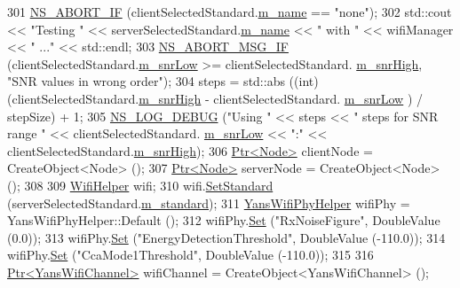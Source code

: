 \begin{DoxyCode}
301   \hyperlink{group__fatal_ga979468222aa80366c2c98aa1554f3eec}{NS\_ABORT\_IF} (clientSelectedStandard.\hyperlink{structStandardInfo_a101f61fce329acf44c178f191d89bc2b}{m\_name} == \textcolor{stringliteral}{"none"});
302   std::cout << \textcolor{stringliteral}{"Testing "} << serverSelectedStandard.\hyperlink{structStandardInfo_a101f61fce329acf44c178f191d89bc2b}{m\_name} << \textcolor{stringliteral}{" with "} << wifiManager << \textcolor{stringliteral}{" ..."} << 
      std::endl;
303   \hyperlink{group__fatal_ga6653324225bc139e46deea177614ceee}{NS\_ABORT\_MSG\_IF} (clientSelectedStandard.\hyperlink{structStandardInfo_afab2372a0827fa35dfb275bf2a003894}{m\_snrLow} >= clientSelectedStandard.
      \hyperlink{structStandardInfo_a9015b8320c397f26eb0eb0d3758c9efa}{m\_snrHigh}, \textcolor{stringliteral}{"SNR values in wrong order"});
304   steps = std::abs ((\textcolor{keywordtype}{int}) (clientSelectedStandard.\hyperlink{structStandardInfo_a9015b8320c397f26eb0eb0d3758c9efa}{m\_snrHigh} - clientSelectedStandard.
      \hyperlink{structStandardInfo_afab2372a0827fa35dfb275bf2a003894}{m\_snrLow} ) / stepSize) + 1;
305   \hyperlink{group__logging_ga413f1886406d49f59a6a0a89b77b4d0a}{NS\_LOG\_DEBUG} (\textcolor{stringliteral}{"Using "} << steps << \textcolor{stringliteral}{" steps for SNR range "} << clientSelectedStandard.
      \hyperlink{structStandardInfo_afab2372a0827fa35dfb275bf2a003894}{m\_snrLow} << \textcolor{stringliteral}{":"} << clientSelectedStandard.\hyperlink{structStandardInfo_a9015b8320c397f26eb0eb0d3758c9efa}{m\_snrHigh});
306   \hyperlink{classns3_1_1Ptr}{Ptr<Node>} clientNode = CreateObject<Node> ();
307   \hyperlink{classns3_1_1Ptr}{Ptr<Node>} serverNode = CreateObject<Node> ();
308 
309   \hyperlink{classns3_1_1WifiHelper}{WifiHelper} wifi;
310   wifi.\hyperlink{classns3_1_1WifiHelper_aa54f3e61527ef8de318d310045bc5dfd}{SetStandard} (serverSelectedStandard.\hyperlink{structStandardInfo_ab7a9f14bfafa7c4a6eb65073bdb28489}{m\_standard});
311   \hyperlink{classns3_1_1YansWifiPhyHelper}{YansWifiPhyHelper} wifiPhy = YansWifiPhyHelper::Default ();
312   wifiPhy.\hyperlink{classns3_1_1WifiPhyHelper_a2527d6d7b29f717fd7436166c5f05f1a}{Set} (\textcolor{stringliteral}{"RxNoiseFigure"}, DoubleValue (0.0));
313   wifiPhy.\hyperlink{classns3_1_1WifiPhyHelper_a2527d6d7b29f717fd7436166c5f05f1a}{Set} (\textcolor{stringliteral}{"EnergyDetectionThreshold"}, DoubleValue (-110.0));
314   wifiPhy.\hyperlink{classns3_1_1WifiPhyHelper_a2527d6d7b29f717fd7436166c5f05f1a}{Set} (\textcolor{stringliteral}{"CcaMode1Threshold"}, DoubleValue (-110.0));
315 
316   \hyperlink{classns3_1_1Ptr}{Ptr<YansWifiChannel>} wifiChannel = CreateObject<YansWifiChannel> ();

\end{DoxyCode}
